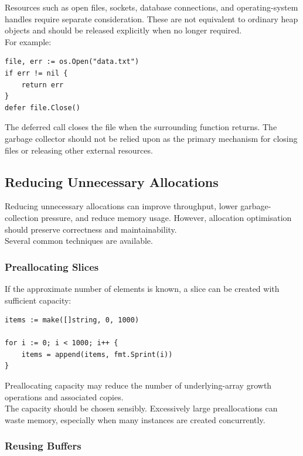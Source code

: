 Resources such as open files, sockets, database connections, and operating-system handles require separate consideration. These are not equivalent to ordinary heap objects and should be released explicitly when no longer required.\\

For example:

\begin{lstlisting}
file, err := os.Open("data.txt")
if err != nil {
    return err
}
defer file.Close()
\end{lstlisting}

The deferred call closes the file when the surrounding function returns. The garbage collector should not be relied upon as the primary mechanism for closing files or releasing other external resources.

\subsection{Reducing Unnecessary Allocations}

Reducing unnecessary allocations can improve throughput, lower garbage-collection pressure, and reduce memory usage. However, allocation optimisation should preserve correctness and maintainability.\\

Several common techniques are available.

\subsubsection{Preallocating Slices}

If the approximate number of elements is known, a slice can be created with sufficient capacity:

\begin{lstlisting}
items := make([]string, 0, 1000)

for i := 0; i < 1000; i++ {
    items = append(items, fmt.Sprint(i))
}
\end{lstlisting}

Preallocating capacity may reduce the number of underlying-array growth operations and associated copies.\\

The capacity should be chosen sensibly. Excessively large preallocations can waste memory, especially when many instances are created concurrently.

\subsubsection{Reusing Buffers}

